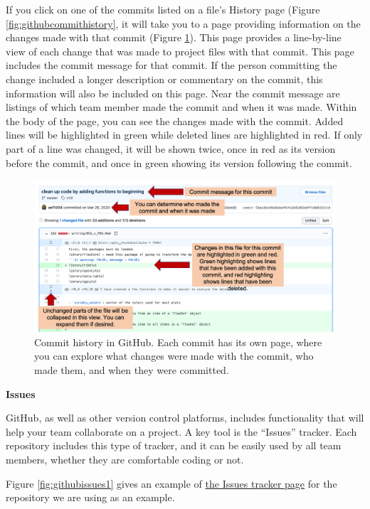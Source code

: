 \documentclass[]{tufte-book}
\begin{document}
If you click on one of the commits listed on a file's History page (Figure
\ref{fig:githubcommithistory}, it will take you to a page providing information
on the changes made with that commit (Figure \ref{fig:githubcommithistory2}).
This page provides a line-by-line view of each change that was made to project
files with that commit. This page includes the commit message for that commit.
If the person committing the change included a longer description or commentary
on the commit, this information will also be included on this page. Near the
commit message are listings of which team member made the commit and when it was
made. Within the body of the page, you can see the changes made with the commit.
Added lines will be highlighted in green while deleted lines are highlighted in
red. If only part of a line was changed, it will be shown twice, once in red as
its version before the commit, and once in green showing its version following
the commit.

\begin{figure}
\includegraphics[width=\textwidth]{figures/github_commit_history2} \caption[Commit history in GitHub]{Commit history in GitHub. Each commit has its own page, where you can explore what changes were made with the commit, who made them, and when they were committed.}\label{fig:githubcommithistory2}
\end{figure}

\textbf{Issues}

GitHub, as well as other version control platforms, includes functionality
that will help your team collaborate on a project. A key tool is the
``Issues'' tracker. Each repository includes this type of tracker, and it
can be easily used by all team members, whether they are comfortable
coding or not.

Figure \ref{fig:githubissues1} gives an example of \href{https://github.com/aef1004/cyto-feature_engineering/issues}{the Issues tracker page} for the
repository we are using as an example.
\end{document}
